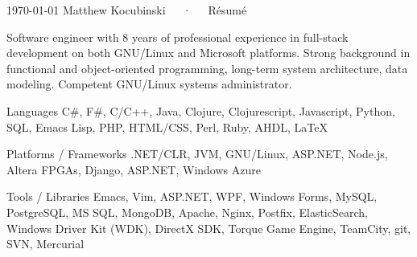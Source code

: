 \documentclass[11pt, letterpaper]{awesome-cv}
\begin{document}
\makecvheader

\makecvfooter
  {\today}
  {Matthew Kocubinski~~~·~~~Résumé}
  {\thepage}



\begin{cvparagraph}
\raggedright
Software engineer with 8 years of professional experience in full-stack development on both GNU/Linux
and Microsoft platforms.  Strong background in functional and object-oriented programming, long-term system architecture, data modeling.  Competent GNU/Linux systems administrator. 
\end{cvparagraph}




\begin{cvskills}

  \cvskill
    {Languages} %
    {C\#, F\#, C/C++, Java, Clojure, Clojurescript, Javascript, Python, SQL, Emacs Lisp, PHP, HTML/CSS, Perl, Ruby, AHDL, LaTeX} %

  \cvskill
    {Platforms / Frameworks} %
    {.NET/CLR, JVM, GNU/Linux, ASP.NET, Node.js, Altera FPGAs, Django, ASP.NET, Windows Azure } %

  \cvskill
    {Tools / Libraries} %
    {Emacs, Vim, ASP.NET, WPF, Windows Forms, MySQL, PostgreSQL, MS SQL, MongoDB, Apache, Nginx, Postfix, ElasticSearch, Windows Driver Kit (WDK), DirectX SDK, Torque Game Engine, TeamCity, git, SVN, Mercurial}

\end{cvskills}
\end{document}
